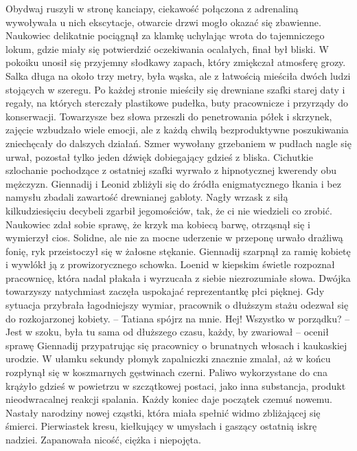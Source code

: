 \documentclass[../MAIN.tex]{subfiles}
\begin{document}
Obydwaj ruszyli w stronę kanciapy, ciekawość połączona z adrenaliną wywoływała u nich ekscytacje, otwarcie drzwi mogło okazać się zbawienne. Naukowiec delikatnie pociągnął za klamkę uchylając wrota do tajemniczego lokum, gdzie miały się potwierdzić oczekiwania ocalałych, finał był bliski. W pokoiku unosił się przyjemny słodkawy zapach, który zmiękczał atmosferę grozy. Salka długa na około trzy metry, była wąska, ale z łatwością mieściła dwóch ludzi stojących w szeregu. Po każdej stronie mieściły się drewniane szafki starej daty i regały, na których sterczały plastikowe pudełka, buty pracownicze i przyrządy do konserwacji. Towarzysze bez słowa przeszli do penetrowania półek i skrzynek, zajęcie wzbudzało wiele emocji, ale z każdą chwilą bezproduktywne poszukiwania zniechęcały do dalszych działań. Szmer wywołany grzebaniem w pudłach nagle się urwał, pozostał tylko jeden dźwięk dobiegający gdzieś z bliska. Cichutkie szlochanie pochodzące z ostatniej szafki wyrwało z hipnotycznej kwerendy obu mężczyzn. Giennadij i Leonid zbliżyli się do źródła enigmatycznego łkania i bez namysłu zbadali zawartość drewnianej gabloty. Nagły wrzask z siłą kilkudziesięciu decybeli zgarbił jegomościów, tak, że ci nie wiedzieli co zrobić. Naukowiec zdał sobie sprawę, że krzyk ma kobiecą barwę, otrząsnął się i wymierzył cios. Solidne, ale nie za mocne uderzenie w przeponę urwało drażliwą fonię, ryk przeistoczył się w żałosne stękanie. Giennadij szarpnął za ramię kobietę i wywlókł ją z prowizorycznego schowka. Loenid w kiepskim świetle rozpoznał pracownicę, która nadal płakała i wyrzucała z siebie niezrozumiałe słowa. Dwójka towarzyszy natychmiast zaczęła uspokajać reprezentantkę płci pięknej. Gdy sytuacja przybrała łagodniejszy wymiar, pracownik o dłuższym stażu odezwał się do rozkojarzonej kobiety. 
-- Tatiana spójrz na mnie. Hej! Wszystko w porządku? 
-- Jest w szoku, była tu sama od dłuższego czasu, każdy, by zwariował -- ocenił sprawę Giennadij przypatrując się pracownicy o brunatnych włosach i kaukaskiej urodzie. 
W ułamku sekundy płomyk zapalniczki znacznie zmalał, aż w końcu rozpłynął się w koszmarnych gęstwinach czerni. Paliwo wykorzystane do cna krążyło gdzieś w powietrzu w szczątkowej postaci, jako inna substancja, produkt nieodwracalnej reakcji spalania. Każdy koniec daje początek czemuś nowemu. Nastały narodziny nowej cząstki, która miała spełnić widmo zbliżającej się śmierci. Pierwiastek kresu, kiełkujący w umysłach i gaszący ostatnią iskrę nadziei. Zapanowała nicość, ciężka i niepojęta. 
\end{document}
